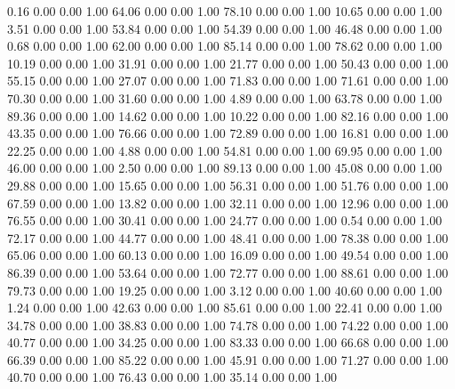     0.16   0.00   0.00   1.00
   64.06   0.00   0.00   1.00
   78.10   0.00   0.00   1.00
   10.65   0.00   0.00   1.00
    3.51   0.00   0.00   1.00
   53.84   0.00   0.00   1.00
   54.39   0.00   0.00   1.00
   46.48   0.00   0.00   1.00
    0.68   0.00   0.00   1.00
   62.00   0.00   0.00   1.00
   85.14   0.00   0.00   1.00
   78.62   0.00   0.00   1.00
   10.19   0.00   0.00   1.00
   31.91   0.00   0.00   1.00
   21.77   0.00   0.00   1.00
   50.43   0.00   0.00   1.00
   55.15   0.00   0.00   1.00
   27.07   0.00   0.00   1.00
   71.83   0.00   0.00   1.00
   71.61   0.00   0.00   1.00
   70.30   0.00   0.00   1.00
   31.60   0.00   0.00   1.00
    4.89   0.00   0.00   1.00
   63.78   0.00   0.00   1.00
   89.36   0.00   0.00   1.00
   14.62   0.00   0.00   1.00
   10.22   0.00   0.00   1.00
   82.16   0.00   0.00   1.00
   43.35   0.00   0.00   1.00
   76.66   0.00   0.00   1.00
   72.89   0.00   0.00   1.00
   16.81   0.00   0.00   1.00
   22.25   0.00   0.00   1.00
    4.88   0.00   0.00   1.00
   54.81   0.00   0.00   1.00
   69.95   0.00   0.00   1.00
   46.00   0.00   0.00   1.00
    2.50   0.00   0.00   1.00
   89.13   0.00   0.00   1.00
   45.08   0.00   0.00   1.00
   29.88   0.00   0.00   1.00
   15.65   0.00   0.00   1.00
   56.31   0.00   0.00   1.00
   51.76   0.00   0.00   1.00
   67.59   0.00   0.00   1.00
   13.82   0.00   0.00   1.00
   32.11   0.00   0.00   1.00
   12.96   0.00   0.00   1.00
   76.55   0.00   0.00   1.00
   30.41   0.00   0.00   1.00
   24.77   0.00   0.00   1.00
    0.54   0.00   0.00   1.00
   72.17   0.00   0.00   1.00
   44.77   0.00   0.00   1.00
   48.41   0.00   0.00   1.00
   78.38   0.00   0.00   1.00
   65.06   0.00   0.00   1.00
   60.13   0.00   0.00   1.00
   16.09   0.00   0.00   1.00
   49.54   0.00   0.00   1.00
   86.39   0.00   0.00   1.00
   53.64   0.00   0.00   1.00
   72.77   0.00   0.00   1.00
   88.61   0.00   0.00   1.00
   79.73   0.00   0.00   1.00
   19.25   0.00   0.00   1.00
    3.12   0.00   0.00   1.00
   40.60   0.00   0.00   1.00
    1.24   0.00   0.00   1.00
   42.63   0.00   0.00   1.00
   85.61   0.00   0.00   1.00
   22.41   0.00   0.00   1.00
   34.78   0.00   0.00   1.00
   38.83   0.00   0.00   1.00
   74.78   0.00   0.00   1.00
   74.22   0.00   0.00   1.00
   40.77   0.00   0.00   1.00
   34.25   0.00   0.00   1.00
   83.33   0.00   0.00   1.00
   66.68   0.00   0.00   1.00
   66.39   0.00   0.00   1.00
   85.22   0.00   0.00   1.00
   45.91   0.00   0.00   1.00
   71.27   0.00   0.00   1.00
   40.70   0.00   0.00   1.00
   76.43   0.00   0.00   1.00
   35.14   0.00   0.00   1.00

